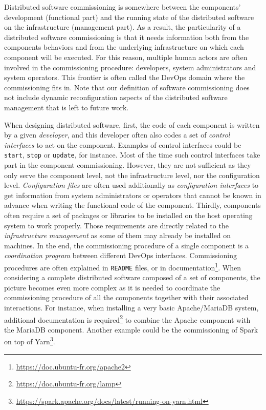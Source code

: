 
Distributed software commissioning is somewhere between the components'
development (functional part) and the running state of the distributed software
on the infrastructure (management part). As a result, the particularity of a
distributed software commissioning is that it needs information both from the
components behaviors and from the underlying infrastructure on which each
component will be executed. For this reason, multiple human actors are often
involved in the commissioning procedure: developers, system administrators and
system operators. This frontier is often called the DevOps domain where the
commissioning fits in. Note that our definition of software commissioning does
not include dynamic reconfiguration aspects of the distributed software management that is left to future work.

When designing distributed software, first, the code of each component is
written by a given \emph{developer}, and this developer often also codes a set
of \emph{control interfaces} to act on the component. Examples of control
interfaces could be \texttt{start}, \texttt{stop} or \texttt{update}, for
instance. Most of the time such control interfaces take part in the component
commissioning. However, they are not sufficient as they only serve the component
level, not the infrastructure level, nor the configuration level.
\emph{Configuration files} are often used additionally as \emph{configuration
	interfaces} to get information from system administrators or operators that
cannot be known in advance when writing the functional code of the component.
 Thirdly, components often require a set of packages or
libraries to be installed on the host operating system to work properly. Those
requirements are directly related to the \emph{infrastructure management} as
some of them may already be installed on machines. %
In the end, the commissioning procedure of a single component is a
\emph{coordination program} between different DevOps interfaces. Commissioning
procedures are often explained in \texttt{README} files, or in
documentation\footnote{\url{https://doc.ubuntu-fr.org/apache2}}. %
%
When considering a complete distributed software composed of a set of
components, the picture becomes even more complex as it is needed to coordinate
the commissioning procedure of all the components together with their associated
interactions. For instance, when installing a very basic Apache/MariaDB system,
additional documentation is
required\footnote{\url{https://doc.ubuntu-fr.org/lamp}} to combine the Apache
component with the MariaDB component. Another example could be the commissioning
of Spark on top of
Yarn\footnote{\url{https://spark.apache.org/docs/latest/running-on-yarn.html}}.

